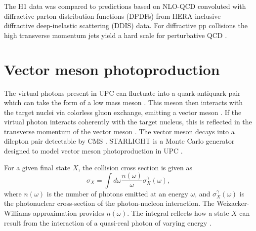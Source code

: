 The H1 data was compared to predictions based on NLO-QCD convoluted with diffractive parton distribution functions (DPDFs) from HERA inclusive diffractive deep-inelastic scattering (DDIS) data. For diffractive pp collisions the high transverse momentum jets yield a hard scale for perturbative QCD \cite{Aaron:2010su}.

\section{Vector meson photoproduction}

The virtual photons present in UPC can fluctuate into a quark-antiquark pair which can take the form of a low mass meson \cite{lta2011.09}\cite{Chekanov:2002xi}\cite{Klasen:2007pm}. This meson then interacts with the target nuclei via colorless gluon exchange, emitting a vector meson \cite{Emling:1994gu} \cite{dePassos:2001dc} \cite{Ryskin:1992ui}\cite{Goldhaber:1948zza}. If the virtual photon interacts coherently with the target nucleus, this is reflected in the transverse momentum of the vector meson \cite{Goncalves:2011vf}\cite{Adler:2002sc}. The vector meson decays into a dilepton pair detectable by CMS \cite{Lappi:2013am}\cite{Gaiser:1982yw}\cite{Aktas:2005xu}\cite{Abbas:2013oua}. STARLIGHT is a Monte Carlo generator designed to model vector meson photoproduction in UPC \cite{starlight}.

For a given final state $X$, the collision cross section is given as
\begin{equation}
\sigma_X = \int d \omega \frac{n(\omega)}{\omega} \sigma_X^\gamma(\omega),
\end{equation}
where $n(\omega)$ is the number of photons emitted at an energy $\omega$, and $\sigma_X^\gamma(\omega)$ is the photonuclear cross-section of the photon-nucleon interaction. The Weizacker-Williams approximation provides $n(\omega)$. The integral reflects how a state $X$ can result from the interaction of a quasi-real photon of varying energy \cite{Nystrand:2004vn}. 

